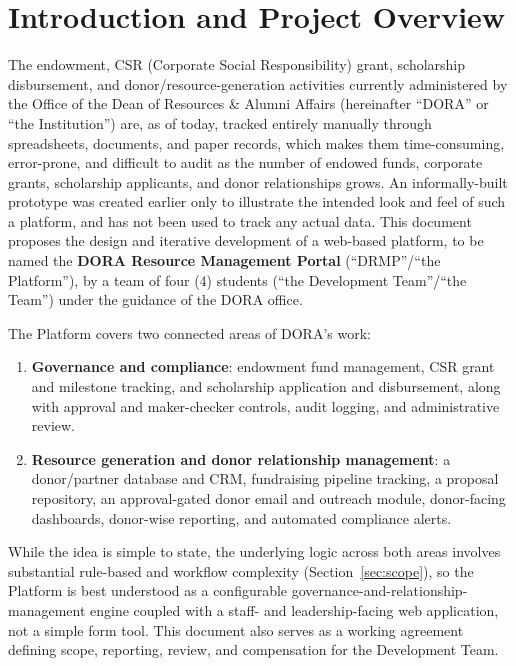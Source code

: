 \documentclass[11pt]{article}
\begin{document}
\tableofcontents
\clearpage

\section{Introduction and Project Overview}
The endowment, CSR (Corporate Social Responsibility) grant, scholarship disbursement, and donor/resource-generation activities currently administered by the Office of the Dean of Resources \& Alumni Affairs (hereinafter ``DORA'' or ``the Institution'') are, as of today, tracked entirely manually through spreadsheets, documents, and paper records, which makes them time-consuming, error-prone, and difficult to audit as the number of endowed funds, corporate grants, scholarship applicants, and donor relationships grows. An informally-built prototype was created earlier only to illustrate the intended look and feel of such a platform, and has not been used to track any actual data. This document proposes the design and iterative development of a web-based platform, to be named the \textbf{DORA Resource Management Portal} (``DRMP''/``the Platform''), by a team of four (4) students (``the Development Team''/``the Team'') under the guidance of the DORA office.

The Platform covers two connected areas of DORA's work:
\begin{enumerate}[leftmargin=1.6em, itemsep=3pt]
\item \textbf{Governance and compliance}: endowment fund management, CSR grant and milestone tracking, and scholarship application and disbursement, along with approval and maker-checker controls, audit logging, and administrative review.
\item \textbf{Resource generation and donor relationship management}: a donor/partner database and CRM, fundraising pipeline tracking, a proposal repository, an approval-gated donor email and outreach module, donor-facing dashboards, donor-wise reporting, and automated compliance alerts.
\end{enumerate}

While the idea is simple to state, the underlying logic across both areas involves substantial rule-based and workflow complexity (Section~\ref{sec:scope}), so the Platform is best understood as a configurable governance-and-relationship-management engine coupled with a staff- and leadership-facing web application, not a simple form tool. This document also serves as a working agreement defining scope, reporting, review, and compensation for the Development Team.
\end{document}
